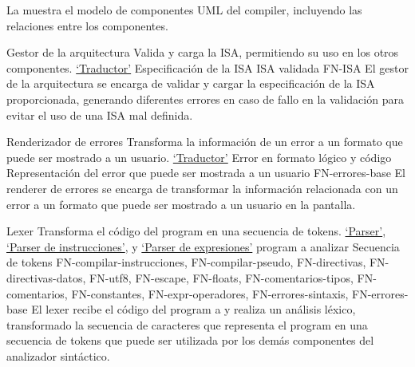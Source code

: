 La  muestra el modelo de componentes UML
\parencite{UMLSpec} del \gls{compiler}, incluyendo las relaciones entre los
componentes.


\printcomptemplate

\newcommand{\componentref}[1]{\hyperref[req:#1]{`#1'}}

\begin{component}{Gestor de la arquitectura}
    {Valida y carga la \gls{ISA}, permitiendo su uso en los otros componentes.} %
    {\componentref{Traductor}} %
    {Especificación de la \gls{ISA}} %
    {\gls{ISA} validada} %
    {FN-ISA} %
    El gestor de la arquitectura se encarga de validar y cargar la
    especificación de la \gls{ISA} proporcionada, generando diferentes errores
    en caso de fallo en la validación para evitar el uso de una \gls{ISA} mal
    definida.
\end{component}

\begin{component}{Renderizador de errores}
    {Transforma la información de un error a un formato que puede ser mostrado a un usuario.} %
    {\componentref{Traductor}} %
    {Error en formato lógico y código } %
    {Representación del error que puede ser mostrada a un usuario} %
    {FN-errores-base} %
    El \gls{renderer} de errores se encarga de transformar la información
    relacionada con un error a un formato que puede ser mostrado a un usuario en
    la pantalla.
\end{component}

\begin{component}{Lexer}
    {Transforma el código del \gls{program} en una secuencia de \glspl{token}.} %
    {\componentref{Parser}, \componentref{Parser de instrucciones}, y \componentref{Parser de expresiones}} %
    {\Gls{program} a analizar} %
    {Secuencia de \glspl{token}} %
    {FN-compilar-instrucciones, FN-compilar-pseudo, FN-directivas,
    FN-directivas-datos, FN-utf8, FN-escape, FN-floats, FN-comentarios-tipos,
    FN-comentarios, FN-constantes, FN-expr-operadores, FN-errores-sintaxis,
    FN-errores-base} %
    El lexer recibe el código del \gls{program} a
     y realiza un análisis léxico, transformado
    la secuencia de caracteres que representa el \gls{program} en una secuencia
    de \glspl{token} que puede ser utilizada por los demás componentes del
    analizador sintáctico.
\end{component}

